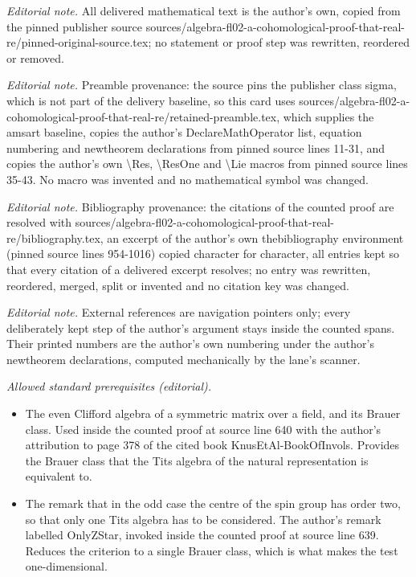 \maketitle
\noindent\textit{Editorial note.} All delivered mathematical text is the author's own, copied from the pinned publisher source sources/algebra-fl02-a-cohomological-proof-that-real-re/pinned-original-source.tex; no statement or proof step was rewritten, reordered or removed.\par\medskip
\noindent\textit{Editorial note.} Preamble provenance: the source pins the publisher class sigma, which is not part of the delivery baseline, so this card uses sources/algebra-fl02-a-cohomological-proof-that-real-re/retained-preamble.tex, which supplies the amsart baseline, copies the author's DeclareMathOperator list, equation numbering and newtheorem declarations from pinned source lines 11-31, and copies the author's own \textbackslash{}Res, \textbackslash{}ResOne and \textbackslash{}Lie macros from pinned source lines 35-43. No macro was invented and no mathematical symbol was changed.\par\medskip
\noindent\textit{Editorial note.} Bibliography provenance: the citations of the counted proof are resolved with sources/algebra-fl02-a-cohomological-proof-that-real-re/bibliography.tex, an excerpt of the author's own thebibliography environment (pinned source lines 954-1016) copied character for character, all entries kept so that every citation of a delivered excerpt resolves; no entry was rewritten, reordered, merged, split or invented and no citation key was changed.\par\medskip
\noindent\textit{Editorial note.} External references are navigation pointers only; every deliberately kept step of the author's argument stays inside the counted spans. Their printed numbers are the author's own numbering under the author's newtheorem declarations, computed mechanically by the lane's scanner.\par\medskip
\noindent\textit{Allowed standard prerequisites (editorial).}\begin{itemize}
\item The even Clifford algebra of a symmetric matrix over a field, and its Brauer class. Used inside the counted proof at source line 640 with the author's attribution to page 378 of the cited book KnusEtAl-BookOfInvols. Provides the Brauer class that the Tits algebra of the natural representation is equivalent to.
\item The remark that in the odd case the centre of the spin group has order two, so that only one Tits algebra has to be considered. The author's remark labelled OnlyZStar, invoked inside the counted proof at source line 639. Reduces the criterion to a single Brauer class, which is what makes the test one-dimensional.
\end{itemize}\medskip
